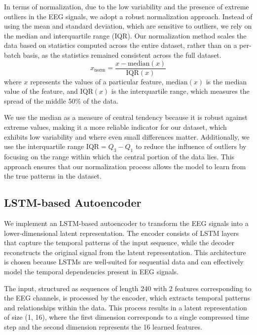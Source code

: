 In terms of normalization, due to the low variability and the presence of extreme outliers in the EEG signals, we adopt a robust normalization approach. Instead of using the mean and standard deviation, which are sensitive to outliers, we rely on the median and interquartile range (IQR). Our normalization method scales the data based on statistics computed across the entire dataset, rather than on a per-batch basis, as the statistics remained consistent across the full dataset.
%
\begin{equation}
x_{\text{norm}} = \frac{x - \text{median}(x)}{\text{IQR}(x)} \label{eq:robust_norm}
\end{equation}
%
where $x$ represents the values of a particular feature, $\text{median}(x)$ is the median value of the feature, and $\text{IQR}(x)$ is the interquartile range, which measures the spread of the middle 50\% of the data.

We use the median as a measure of central tendency because it is robust against extreme values, making it a more reliable indicator for our dataset, which exhibits low variability and where even small differences matter. Additionally, we use the interquartile range $\text{IQR} = Q_3 - Q_1$ to reduce the influence of outliers by focusing on the range within which the central portion of the data lies. This approach ensures that our normalization process allows the model to learn from the true patterns in the dataset.

\subsection{LSTM-based Autoencoder}

We implement an LSTM-based autoencoder to transform the EEG signals into a lower-dimensional latent representation. The encoder consists of LSTM layers that capture the temporal patterns of the input sequence, while the decoder reconstructs the original signal from the latent representation. This architecture is chosen because LSTMs are well-suited for sequential data and can effectively model the temporal dependencies present in EEG signals.

The input, structured as sequences of length 240 with 2 features corresponding to the EEG channels, is processed by the encoder, which extracts temporal patterns and relationships within the data. This process results in a latent representation of size (1, 16), where the first dimension corresponds to a single compressed time step and the second dimension represents the 16 learned features.

